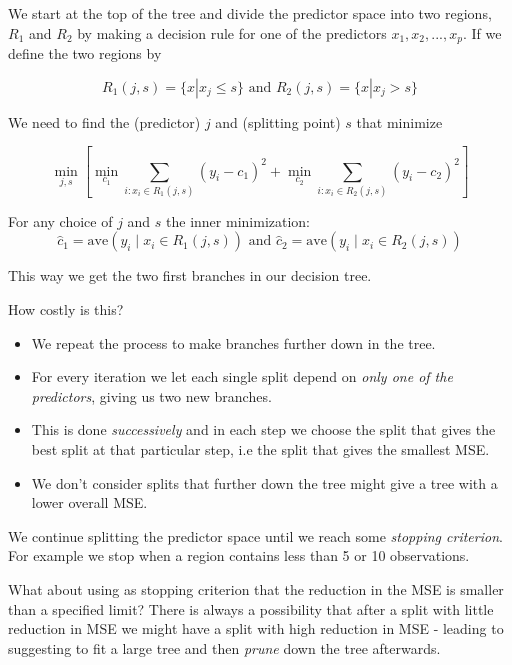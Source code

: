 \documentclass[
  ignorenonframetext,
]{beamer}
\providecommand{\tightlist}{%
  \setlength{\itemsep}{0pt}\setlength{\parskip}{0pt}}
\begin{document}
\begin{frame}

We start at the top of the tree and divide the predictor space into two
regions, \(R_1\) and \(R_2\) by making a decision rule for one of the
predictors \(x_1, x_2,...,x_p\). If we define the two regions by

\[R_1(j,s)=\{x|x_j\le s\} \text{ and }  R_2(j,s)=\{x|x_j > s\}\]

We need to find the (predictor) \(j\) and (splitting point) \(s\) that
minimize

\[\min_{j,s} [ \min_{c_1}\sum_{i: x_i \in R_1(j,s)}(y_i-c_1)^2+\min_{c_2} \sum_{i: x_i \in R_2(j,s)}(y_i -c_2)^2]\]

For any choice of \(j\) and \(s\) the inner minimization:
\[ \hat{c}_1=\text{ave}(y_i \mid x_i \in R_1(j,s)) \text{ and }
\hat{c}_2=\text{ave}(y_i \mid x_i \in R_2(j,s))\]

This way we get the two first branches in our decision tree.

How costly is this?

\end{frame}

\begin{frame}

\begin{itemize}
\tightlist
\item
  We repeat the process to make branches further down in the tree.
\item
  For every iteration we let each single split depend on \emph{only one
  of the predictors}, giving us two new branches.
\item
  This is done \emph{successively} and in each step we choose the split
  that gives the best split at that particular step, i.e the split that
  gives the smallest MSE.
\item
  We don't consider splits that further down the tree might give a tree
  with a lower overall MSE.
\end{itemize}

We continue splitting the predictor space until we reach some
\emph{stopping criterion}. For example we stop when a region contains
less than 5 or 10 observations.

What about using as stopping criterion that the reduction in the MSE is
smaller than a specified limit? There is always a possibility that after
a split with little reduction in MSE we might have a split with high
reduction in MSE - leading to suggesting to fit a large tree and then
\emph{prune} down the tree afterwards.

\end{frame}
\end{document}
